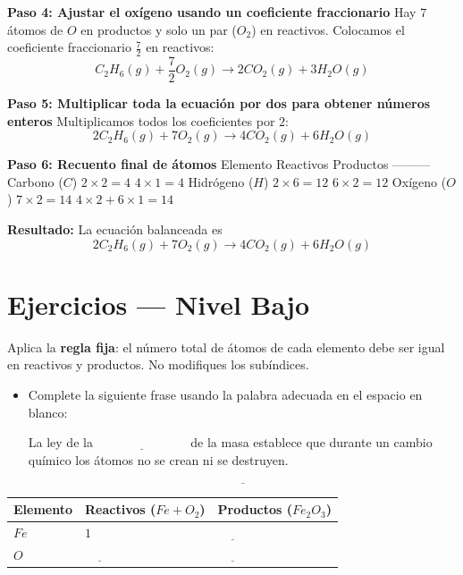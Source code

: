 \documentclass[
  spanish,
  letterpaper,
  12pt,
  oneside,
  open=any]{scrbook}
\newcounter{none} %
\newcommand{\setcolorsection}[2]{%
  \definecolor{currentsectionbg}{HTML}{#1}%
  \definecolor{currentsectionborder}{HTML}{#2}%
}
\begin{document}
\textbf{Paso 4: Ajustar el oxígeno usando un coeficiente fraccionario}
Hay \(7\) átomos de \(O\) en productos y solo un par (\(O_2\)) en
reactivos. Colocamos el coeficiente fraccionario \(\frac{7}{2}\) en
reactivos:
\[C_2H_6(g) + \frac{7}{2}O_2(g) \rightarrow 2CO_2(g) + 3H_2O(g)\]

\textbf{Paso 5: Multiplicar toda la ecuación por dos para obtener
números enteros} Multiplicamos todos los coeficientes por \(2\):
\[2C_2H_6(g) + 7O_2(g) \rightarrow 4CO_2(g) + 6H_2O(g)\]

\textbf{Paso 6: Recuento final de átomos} \textbar{} Elemento \textbar{}
Reactivos \textbar{} Productos \textbar{}
\textbar---\textbar---\textbar---\textbar{} \textbar{} Carbono (\(C\))
\textbar{} \(2 \times 2 = 4\) \textbar{} \(4 \times 1 = 4\) \textbar{}
\textbar{} Hidrógeno (\(H\)) \textbar{} \(2 \times 6 = 12\) \textbar{}
\(6 \times 2 = 12\) \textbar{} \textbar{} Oxígeno (\(O\)) \textbar{}
\(7 \times 2 = 14\) \textbar{} \(4 \times 2 + 6 \times 1 = 14\)
\textbar{}

\textbf{Resultado:} La ecuación balanceada es
\[2C_2H_6(g) + 7O_2(g) \rightarrow 4CO_2(g) + 6H_2O(g)\]

\setcolorsection{b2e0d8}{98ccc4}

\section{Ejercicios --- Nivel Bajo}\label{ejercicios-nivel-bajo-1}

Aplica la \textbf{regla fija}: el número total de átomos de cada
elemento debe ser igual en reactivos y productos. No modifiques los
subíndices.

\begin{itemize}
\item
  Complete la siguiente frase usando la palabra adecuada en el espacio
  en blanco:

  La ley de la \(\underline{\hspace{3cm}}\) de la masa establece que
  durante un cambio químico los átomos no se crean ni se destruyen.

  \[\underline{\hspace{6cm}}\]
\end{itemize}

{\def\LTcaptype{none} %
\begin{longtable}[]{@{}lll@{}}
\toprule\noalign{}
Elemento & Reactivos (\(Fe + O_2\)) & Productos (\(Fe_2O_3\)) \\
\midrule\noalign{}
\endhead
\bottomrule\noalign{}
\endlastfoot
\(Fe\) & \(1\) & \(\underline{\hspace{1cm}}\) \\
\(O\) & \(\underline{\hspace{1cm}}\) & \(\underline{\hspace{1cm}}\) \\
\end{longtable}
}
\end{document}
